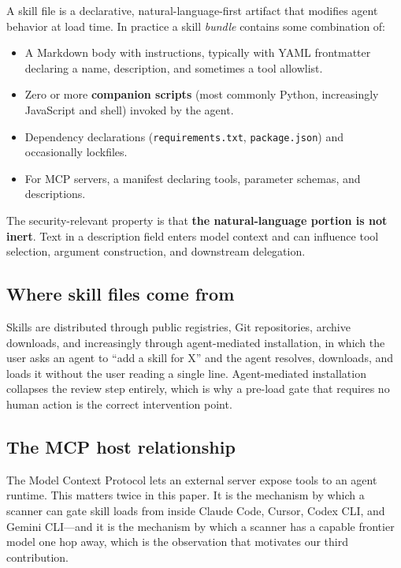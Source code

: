 \documentclass[11pt]{article}
\begin{document}
A skill file is a declarative, natural-language-first artifact that modifies
agent behavior at load time. In practice a skill \emph{bundle} contains some
combination of:

\begin{itemize}[leftmargin=*,itemsep=2pt]
  \item A Markdown body with instructions, typically with YAML frontmatter
  declaring a name, description, and sometimes a tool allowlist.
  \item Zero or more \textbf{companion scripts} (most commonly Python,
  increasingly JavaScript and shell) invoked by the agent.
  \item Dependency declarations (\texttt{requirements.txt},
  \texttt{package.json}) and occasionally lockfiles.
  \item For MCP servers, a manifest declaring tools, parameter schemas, and
  descriptions.
\end{itemize}

The security-relevant property is that \textbf{the natural-language portion is
not inert}. Text in a description field enters model context and can influence
tool selection, argument construction, and downstream delegation.

\subsection{Where skill files come from}

Skills are distributed through public registries, Git repositories, archive
downloads, and increasingly through agent-mediated installation, in which the
user asks an agent to ``add a skill for X'' and the agent resolves, downloads,
and loads it without the user reading a single line. Agent-mediated
installation collapses the review step entirely, which is why a pre-load gate
that requires no human action is the correct intervention point.

\subsection{The MCP host relationship}

The Model Context Protocol lets an external server expose tools to an agent
runtime. This matters twice in this paper. It is the mechanism by which a
scanner can gate skill loads from inside Claude Code, Cursor, Codex CLI, and
Gemini CLI---and it is the mechanism by which a scanner has a capable frontier
model one hop away, which is the observation that motivates our third
contribution.
\end{document}

